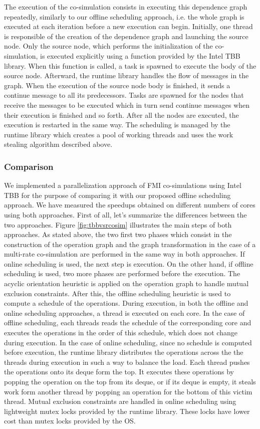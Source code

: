The execution of the co-simulation consists in executing this dependence graph repeatedly, similarly to our offline scheduling approach, i.e. the whole graph is executed at each iteration before a new execution can begin. Initially, one thread is responsible of the creation of the dependence graph and launching the source node. Only the source node, which performs the initialization of the co-simulation, is executed explicitly using a function provided by the Intel TBB library. When this function is called, a task is spawned to execute the body of the source node. Afterward, the runtime library handles the flow of messages in the graph. When the execution of the source node body is finished, it sends a continue message to all its predecessors. Tasks are spawned for the nodes that receive the messages to be executed which in turn send continue messages when their execution is finished and so forth. After all the nodes are executed, the execution is restarted in the same way. The scheduling is managed by the runtime library which creates a pool of working threads and uses the work stealing algorithm described above.

\subsubsection{Comparison}

We implemented a parallelization approach of FMI co-simulations using Intel TBB for the purpose of comparing it with our proposed offline scheduling approach. We have measured the speedups obtained on different numbers of cores using both approaches. First of all, let's summarize the differences between the two approaches. Figure \ref{fig:tbbvsrcosim} illustrates the main steps of both approaches. As stated above, the two first two phases which consist in the construction of the operation graph and the graph transformation in the case of a multi-rate co-simulation are performed in the same way in both approaches. If online scheduling is used, the next step is execution. On the other hand, if offline scheduling is used, two more phases are performed before the execution. The acyclic orientation heuristic is applied on the operation graph to handle mutual exclusion constraints. After this, the offline scheduling heuristic is used to compute a schedule of the operations. During execution, in both the offline and online scheduling approaches, a thread is executed on each core. In the case of offline scheduling, each threads reads the schedule of the corresponding core and executes the operations in the order of this schedule, which does not change during execution. In the case of online scheduling, since no schedule is computed before execution, the runtime library distributes the operations across the the threads during execution in such a way to balance the load. Each thread pushes the operations onto its deque form the top. It executes these operations by popping the operation on the top from its deque, or if its deque is empty, it steals work form another thread by popping an operation for the bottom of this victim thread. Mutual exclusion constraints are handled in online scheduling using lightweight mutex locks provided by the runtime library. These locks have lower cost than mutex locks provided by the OS. 

